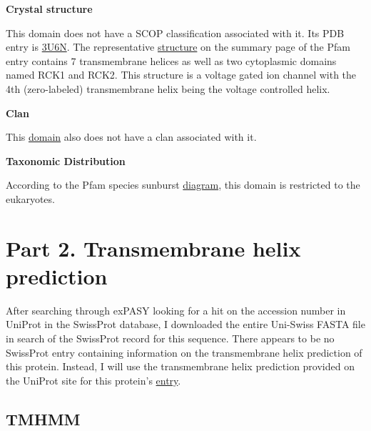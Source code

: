 \documentclass[11pt]{article}
\begin{document}
{\bf Crystal structure}

This domain does not have a SCOP classification associated with it. Its PDB
entry is \href{http://pfam.sanger.ac.uk/structure/3U6N}{3U6N}. The representative
\href{http://en.wikipedia.org/wiki/File:BK-cartoon_wp.jpg}{structure} 
on the summary page of the Pfam entry contains 7 transmembrane helices 
as well as two cytoplasmic domains named RCK1 and RCK2. This structure is a voltage
gated ion channel with the 4th (zero-labeled) transmembrane helix being the voltage
controlled helix.

{\bf Clan}

This \href{http://pfam.sanger.ac.uk/family/PF03493.13}{domain} also does not have a 
clan associated with it. 

{\bf Taxonomic Distribution}

According to the Pfam species sunburst \href{http://pfam.sanger.ac.uk/family/PF03493.13#tabview=tab7}{diagram}, this domain is restricted to
the eukaryotes. 


\section*{Part 2. Transmembrane helix prediction}

After searching through exPASY looking for a hit on the accession number in UniProt 
in the SwissProt database, I downloaded the entire Uni-Swiss FASTA file in search
of the SwissProt record for this sequence. There appears to be no SwissProt entry 
containing information on the transmembrane helix prediction of this protein. Instead,
I will use the transmembrane helix prediction provided on the UniProt site for this
protein's \href{http://www.uniprot.org/uniprot/Q8QFV0}{entry}. 

\subsection*{TMHMM}
\end{document}

